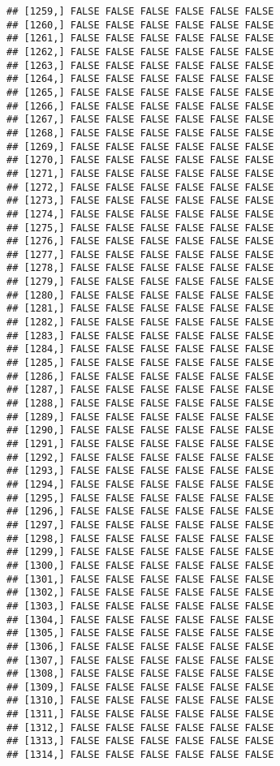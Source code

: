\documentclass[
]{article}
\begin{document}
\begin{verbatim}
## [1259,] FALSE FALSE FALSE FALSE FALSE FALSE
## [1260,] FALSE FALSE FALSE FALSE FALSE FALSE
## [1261,] FALSE FALSE FALSE FALSE FALSE FALSE
## [1262,] FALSE FALSE FALSE FALSE FALSE FALSE
## [1263,] FALSE FALSE FALSE FALSE FALSE FALSE
## [1264,] FALSE FALSE FALSE FALSE FALSE FALSE
## [1265,] FALSE FALSE FALSE FALSE FALSE FALSE
## [1266,] FALSE FALSE FALSE FALSE FALSE FALSE
## [1267,] FALSE FALSE FALSE FALSE FALSE FALSE
## [1268,] FALSE FALSE FALSE FALSE FALSE FALSE
## [1269,] FALSE FALSE FALSE FALSE FALSE FALSE
## [1270,] FALSE FALSE FALSE FALSE FALSE FALSE
## [1271,] FALSE FALSE FALSE FALSE FALSE FALSE
## [1272,] FALSE FALSE FALSE FALSE FALSE FALSE
## [1273,] FALSE FALSE FALSE FALSE FALSE FALSE
## [1274,] FALSE FALSE FALSE FALSE FALSE FALSE
## [1275,] FALSE FALSE FALSE FALSE FALSE FALSE
## [1276,] FALSE FALSE FALSE FALSE FALSE FALSE
## [1277,] FALSE FALSE FALSE FALSE FALSE FALSE
## [1278,] FALSE FALSE FALSE FALSE FALSE FALSE
## [1279,] FALSE FALSE FALSE FALSE FALSE FALSE
## [1280,] FALSE FALSE FALSE FALSE FALSE FALSE
## [1281,] FALSE FALSE FALSE FALSE FALSE FALSE
## [1282,] FALSE FALSE FALSE FALSE FALSE FALSE
## [1283,] FALSE FALSE FALSE FALSE FALSE FALSE
## [1284,] FALSE FALSE FALSE FALSE FALSE FALSE
## [1285,] FALSE FALSE FALSE FALSE FALSE FALSE
## [1286,] FALSE FALSE FALSE FALSE FALSE FALSE
## [1287,] FALSE FALSE FALSE FALSE FALSE FALSE
## [1288,] FALSE FALSE FALSE FALSE FALSE FALSE
## [1289,] FALSE FALSE FALSE FALSE FALSE FALSE
## [1290,] FALSE FALSE FALSE FALSE FALSE FALSE
## [1291,] FALSE FALSE FALSE FALSE FALSE FALSE
## [1292,] FALSE FALSE FALSE FALSE FALSE FALSE
## [1293,] FALSE FALSE FALSE FALSE FALSE FALSE
## [1294,] FALSE FALSE FALSE FALSE FALSE FALSE
## [1295,] FALSE FALSE FALSE FALSE FALSE FALSE
## [1296,] FALSE FALSE FALSE FALSE FALSE FALSE
## [1297,] FALSE FALSE FALSE FALSE FALSE FALSE
## [1298,] FALSE FALSE FALSE FALSE FALSE FALSE
## [1299,] FALSE FALSE FALSE FALSE FALSE FALSE
## [1300,] FALSE FALSE FALSE FALSE FALSE FALSE
## [1301,] FALSE FALSE FALSE FALSE FALSE FALSE
## [1302,] FALSE FALSE FALSE FALSE FALSE FALSE
## [1303,] FALSE FALSE FALSE FALSE FALSE FALSE
## [1304,] FALSE FALSE FALSE FALSE FALSE FALSE
## [1305,] FALSE FALSE FALSE FALSE FALSE FALSE
## [1306,] FALSE FALSE FALSE FALSE FALSE FALSE
## [1307,] FALSE FALSE FALSE FALSE FALSE FALSE
## [1308,] FALSE FALSE FALSE FALSE FALSE FALSE
## [1309,] FALSE FALSE FALSE FALSE FALSE FALSE
## [1310,] FALSE FALSE FALSE FALSE FALSE FALSE
## [1311,] FALSE FALSE FALSE FALSE FALSE FALSE
## [1312,] FALSE FALSE FALSE FALSE FALSE FALSE
## [1313,] FALSE FALSE FALSE FALSE FALSE FALSE
## [1314,] FALSE FALSE FALSE FALSE FALSE FALSE

\end{verbatim}
\end{document}
